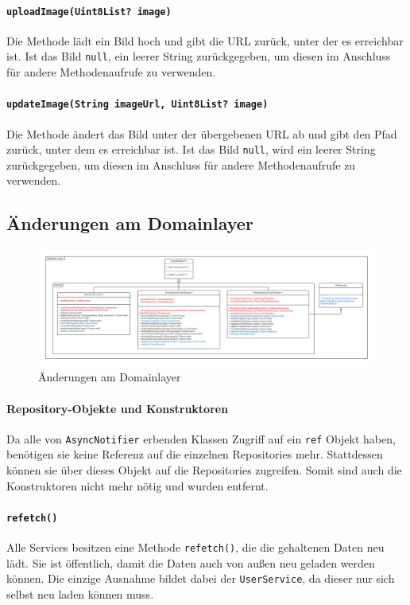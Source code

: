 \documentclass{implementierungsheft}
\begin{document}
\paragraph{\texttt{uploadImage(Uint8List? image)}} Die Methode lädt ein Bild hoch und gibt die URL zurück, unter der es erreichbar ist. Ist das Bild \texttt{null}, ein leerer String zurückgegeben, um diesen im Anschluss für andere Methodenaufrufe zu verwenden.
\paragraph{\texttt{updateImage(String imageUrl, Uint8List? image)}} Die Methode ändert das Bild unter der übergebenen URL ab und gibt den Pfad zurück, unter dem es erreichbar ist. Ist das Bild \texttt{null}, wird ein leerer String zurückgegeben, um diesen im Anschluss für andere Methodenaufrufe zu verwenden.
\newpage
\subsection{Änderungen am Domainlayer}
\begin{figure}[htp]
    \centering
    \includegraphics[width=\textwidth]{images/uml/domainLayer.pdf}
    \caption{Änderungen am Domainlayer}
    \label{fig:domainLayer}
\end{figure}
\paragraph{Repository-Objekte und Konstruktoren}
Da alle von \texttt{AsyncNotifier} erbenden Klassen Zugriff auf ein \texttt{ref} Objekt haben, benötigen sie keine Referenz auf die einzelnen Repositories mehr. Stattdessen können sie über dieses Objekt auf die Repositories zugreifen. Somit sind auch die Konstruktoren nicht mehr nötig und wurden entfernt.
\paragraph{\texttt{refetch()}}
Alle Services besitzen eine Methode \texttt{refetch()}, die die gehaltenen Daten neu lädt. Sie ist öffentlich, damit die Daten auch von außen neu geladen werden können. Die einzige Ausnahme bildet dabei der \texttt{UserService}, da dieser nur sich selbst neu laden können muss.
\end{document}
